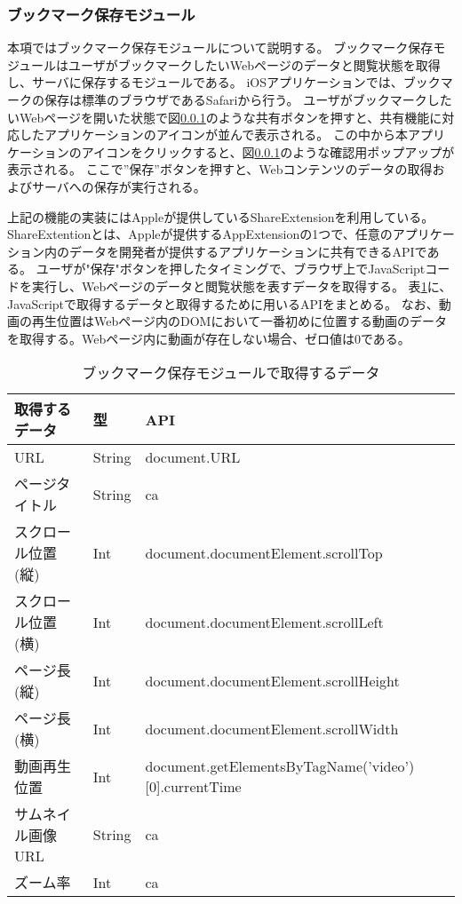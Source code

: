 \subsubsection{ブックマーク保存モジュール}
本項ではブックマーク保存モジュールについて説明する。
ブックマーク保存モジュールはユーザがブックマークしたいWebページのデータと閲覧状態を取得し、サーバに保存するモジュールである。
iOSアプリケーションでは、ブックマークの保存は標準のブラウザであるSafariから行う。
ユーザがブックマークしたいWebページを開いた状態で図\ref{}のような共有ボタンを押すと、共有機能に対応したアプリケーションのアイコンが並んで表示される。
この中から本アプリケーションのアイコンをクリックすると、図\ref{}のような確認用ポップアップが表示される。
ここで”保存”ボタンを押すと、Webコンテンツのデータの取得およびサーバへの保存が実行される。

上記の機能の実装にはAppleが提供しているShareExtension\cite{}を利用している。
ShareExtentionとは、Appleが提供するAppExtension\cite{app-extension}の1つで、任意のアプリケーション内のデータを開発者が提供するアプリケーションに共有できるAPIである。
ユーザが"保存"ボタンを押したタイミングで、ブラウザ上でJavaScriptコードを実行し、Webページのデータと閲覧状態を表すデータを取得する。
表\ref{tb:ios-data-js-api}に、JavaScriptで取得するデータと取得するために用いるAPIをまとめる。
なお、動画の再生位置はWebページ内のDOMにおいて一番初めに位置する動画のデータを取得する。Webページ内に動画が存在しない場合、ゼロ値は0である。

\begin{table}[htbp]
  \label{tb:ios-data-js-api}
  \caption{ブックマーク保存モジュールで取得するデータ}
  \begin{center}
    \begin{tabular}{|l|l|l|}
    \hline
    取得するデータ & 型 & API \\ \hline
    URL & String & document.URL \\ \hline
    ページタイトル & String & ca \\ \hline
    スクロール位置(縦) & Int & document.documentElement.scrollTop \\ \hline
    スクロール位置(横) & Int & document.documentElement.scrollLeft \\ \hline
    ページ長(縦) & Int & document.documentElement.scrollHeight \\ \hline
    ページ長(横) & Int & document.documentElement.scrollWidth \\ \hline
    動画再生位置 & Int & document.getElementsByTagName('video')[0].currentTime \\ \hline
    サムネイル画像URL & String & ca \\ \hline
    ズーム率 & Int & ca \\ \hline
    \end{tabular}
  \end{center}
\end{table}

